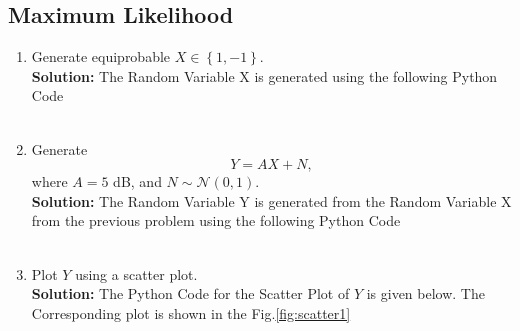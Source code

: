\documentclass[journal,10pt,twocolumn]{IEEEtran}
\newcounter{Chapcounter}
\numberwithin{equation}{subsection}
\numberwithin{figure}{subsection}
\renewcommand\thesection{\theChapcounter.\arabic{section}}
\providecommand{\cbrak}[1]{\ensuremath{\left\{#1\right\}}}
\newcommand{\solution}{\noindent \textbf{Solution: }}
\providecommand{\gauss}[2]{\mathcal{N}\ensuremath{\left(#1,#2\right)}}
\renewcommand\thesection{\arabic{section}}
\renewcommand\thesubsection{\thesection.\arabic{subsection}}
\begin{document}
\subsection{\textbf{Maximum Likelihood}}
\begin{enumerate}[label=\thesubsection.\arabic*,ref=\thesubsection.\arabic{figure}]
\item Generate equiprobable $X \in \cbrak{1,-1}$.\\

\solution The Random Variable X is generated using the following Python Code\\

\\

\item Generate 
\begin{equation}
Y = AX+N,
\end{equation}
		where $A = 5$ dB,  and $N \sim \gauss{0}{1}$.\\


\solution The Random Variable Y is generated from the Random Variable X from the previous problem using the following Python Code\\

\\	
	
\item Plot $Y$ using a scatter plot.\\

\solution
The Python Code for the Scatter Plot of $Y$ is given below. The Corresponding plot is shown in the Fig.\ref{fig:scatter1} \\

\\


\end{enumerate}
\end{document}

